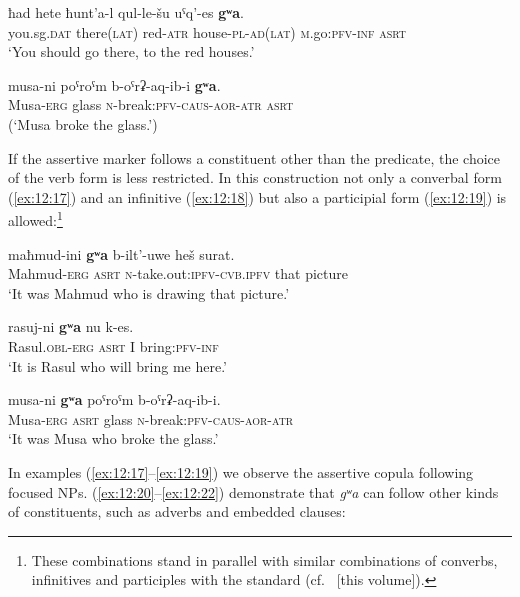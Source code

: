 ﻿\documentclass[output=paper]{langsci/langscibook}
\begin{document}
\ex \label{ex:12:15} %
\gll ħad hete ħunt'a-l qul-le-šu uˤq'-es \textbf{gʷa}.\\
you.sg.\textsc{dat} there(\textsc{lat}) red-\textsc{atr} house-\textsc{pl}-\textsc{ad}(\textsc{lat}) \textsc{m}.go:\textsc{pfv}-\textsc{inf} \textsc{asrt}\\
\glt `You should go there, to the red houses.'

\ex \label{ex:12:16} %
\gll *musa-ni poˤroˤm b-oˤrʡ-aq-ib-i \textbf{gʷa}.\\
Musa-\textsc{erg} glass \textsc{n}-break:\textsc{pfv}-\textsc{caus}-\textsc{aor}-\textsc{atr} \textsc{asrt}\\
\glt (`Musa broke the glass.')
\z


If the assertive marker follows a constituent other than the predicate,
the choice of the verb form is less restricted. In this construction not
only a converbal form (\ref{ex:12:17}) and an infinitive (\ref{ex:12:18}) but also a participial
form (\ref{ex:12:19}) is allowed:\footnote{These combinations stand in parallel with
  similar combinations of converbs, infinitives and participles with the
  standard  (cf.\ \citealt{daniel2019} [this volume]).}

\ea \label{ex:12:17} %
\gll maħmud-ini \textbf{gʷa} b-ilt'-uwe heš surat.\\
Mahmud-\textsc{erg} \textsc{asrt} \textsc{n}-take.out:\textsc{ipfv}-\textsc{cvb.ipfv} that picture\\
\glt `It was Mahmud who is drawing that picture.'

\ex \label{ex:12:18} %
\gll rasuj-ni \textbf{gʷa} nu k-es.\\
Rasul.\textsc{obl}-\textsc{erg} \textsc{asrt} I bring:\textsc{pfv}-\textsc{inf}\\
\glt `It is Rasul who will bring me here.'

\ex \label{ex:12:19} %
\gll musa-ni \textbf{gʷa} poˤroˤm b-oˤrʡ-aq-ib-i.\\
Musa-\textsc{erg} \textsc{asrt} glass \textsc{n}-break:\textsc{pfv}-\textsc{caus}-\textsc{aor}-\textsc{atr}\\
\glt `It was Musa who broke the glass.'
\z

In examples (\ref{ex:12:17}–\ref{ex:12:19}) we observe the assertive copula following focused
NPs. (\ref{ex:12:20}–\ref{ex:12:22}) demonstrate that \emph{gʷa} can follow other kinds of
constituents, such as adverbs and embedded clauses:
\end{document}
